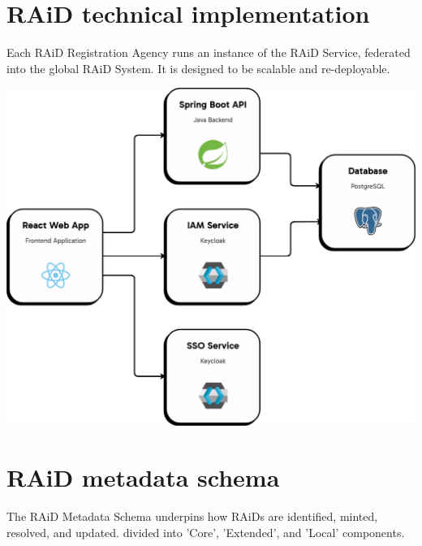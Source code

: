 \documentclass[a0,portrait]{a0poster}
\newenvironment{Figure}
  {\par\medskip\noindent\minipage{\linewidth}}
  {\endminipage\par\medskip}
\begin{document}
\begin{multicols}{2}
\section*{\LARGE RAiD technical implementation}
\color{DarkGrey}
\large{
Each RAiD Registration Agency runs an instance of the RAiD Service, federated into the global RAiD System. It is designed to be scalable and re-deployable. 
}

\vspace{2cm}


\begin{Figure}
  \centering
  \includegraphics[width=\linewidth]{figures/20241023-raid-architecture-appflow-basic.png}
  \label{basic-architecture}
\end{Figure}




\color{ARDCPurple}
\section*{\LARGE RAiD metadata schema}
\color{DarkGrey}
\large{
The RAiD Metadata Schema underpins how RAiDs are identified, minted, resolved, and updated. divided into 'Core', 'Extended', and 'Local' components. 

}
\end{multicols}
\end{document}
